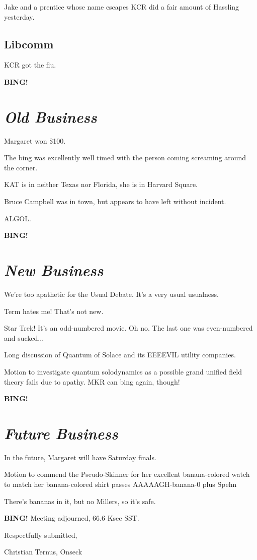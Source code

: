\documentclass[10pt]{article}
\newcommand{\bing}{{\bf BING!} }
\newcommand{\goto}[1]{\bing \vskip 12pt \section*{{\em{#1}}}}
\newcommand{\ps}{ plus Spehn\xspace}
\begin{document}
Jake and a prentice whose name escapes KCR did a fair amount of Hassling yesterday.

\subsection*{Libcomm}

KCR got the flu.

\goto{Old Business}

Margaret won \$100.

The bing was excellently well timed with the person coming screaming around the corner.

KAT is in neither Texas nor Florida, she is in Harvard Square.

Bruce Campbell was in town, but appears to have left without incident.

ALGOL.

\goto{New Business}

We're too apathetic for the Usual Debate.  It's a very usual usualness.

Term hates me!  That's not new.

Star Trek!  It's an odd-numbered movie.  Oh no.  The last one was
even-numbered and sucked...

Long discussion of Quantum of Solace and its EEEEVIL utility companies.

Motion to investigate quantum solodynamics as a possible grand unified
field theory fails due to apathy.  MKR can bing again, though!

\goto{Future Business}

In the future, Margaret will have Saturday finals.

Motion to commend the Pseudo-Skinner for her excellent banana-colored
watch to match her banana-colored shirt passes AAAAAGH-banana-0\ps

There's bananas in it, but no Millers, so it's safe.

\bing
\noindent
Meeting adjourned, 66.6 Ksec SST.

\vspace{18pt}

\centerline{Respectfully submitted,}
\centerline{Christian Ternus, Onseck}
\end{document}
